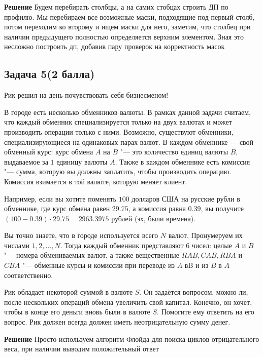 \documentclass[a4paper, 12pt]{article}
\theoremstyle{plain}
\theoremstyle{definition}
\theoremstyle{remark}
\begin{document}
\textbf{Решение} Будем перебирать столбцы, а на самих стобцах строить ДП по профилю. Мы перебираем все возможные маски, подходящие под первый столб, потом переходим ко второму и ищем маски для него, заметим, что столбец при наличии предыдущего полностью определяется верхним элементом. Зная это несложно построить дп, добавив пару проверок на корректность масок

\subsection{Задача 5(2 балла)}
Рик решил на день почувствовать себя бизнесменом!

В городе есть несколько обменников валюты. В рамках данной задачи считаем, что каждый обменник специализируется только на двух валютах и может производить операции только с ними. Возможно, существуют обменники, специализирующиеся на одинаковых парах валют. В каждом обменнике --- свой обменный курс: курс обмена $A$ на $B$ "--- это количество единиц валюты $B$, выдаваемое за $1$ единицу валюты $A$. Также в каждом обменнике есть комиссия "--- сумма, которую вы должны заплатить, чтобы производить операцию. Комиссия взимается в той валюте, которую меняет клиент.

Например, если вы хотите поменять $100$ долларов США на русские рубли в обменнике, где курс обмена равен $29.75$, а комиссия равна $0.39$, вы получите $(100-0.39)\cdot29.75=2963.3975$ рублей (эх, были времена).

Вы точно знаете, что в городе используется всего $N$ валют. Пронумеруем их числами $1,2,\dots,N$. Тогда каждый обменник представляют $6$ чисел: целые $A$ и $B$ "--- номера обмениваемых валют, а также вещественные $RAB,CAB,RBA$ и $CBA$ "--- обменные курсы и комиссии при переводе из $A$ в$ $B и из $B$ в $A$ соответственно.

Рик обладает некоторой суммой в валюте $S$. Он задаётся вопросом, можно ли, после нескольких операций обмена увеличить свой капитал. Конечно, он хочет, чтобы в конце его деньги вновь были в валюте $S$. Помогите ему ответить на его вопрос. Рик должен всегда должен иметь неотрицательную сумму денег.

\textbf{Решение} Просто используем алгоритм Флойда для поиска циклов отрицательного веса, при наличии выводим положительный ответ
\end{document}
